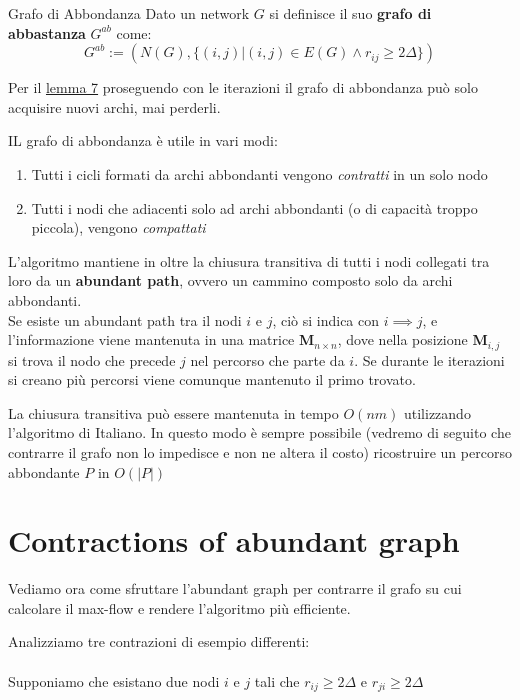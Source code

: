 \documentclass[a4paper, 11pt]{report}
\begin{document}
\begin{definition}{Grafo di Abbondanza}{}
    Dato un network $G$ si definisce il suo \textbf{grafo di abbastanza} $G^{ab}$ come: 
    \[G^{ab} := (N(G), \{(i,j)| (i,j)\in E(G)\land r_{ij}\ge 2\Delta\})\]
\end{definition}
\begin{obs}{}{}
    Per il \hyperref[ab4ever]{lemma 7} proseguendo con le iterazioni il grafo di abbondanza può solo acquisire nuovi archi, mai perderli.
\end{obs}

IL grafo di abbondanza è utile in vari modi: 
\begin{enumerate}
    \item Tutti i cicli formati da archi abbondanti vengono \textit{contratti} in un solo nodo
    \item Tutti i nodi che adiacenti solo ad archi abbondanti (o di capacità troppo piccola), vengono \textit{compattati}
\end{enumerate}
L'algoritmo mantiene in oltre la chiusura transitiva di tutti i nodi collegati tra loro da un \textbf{abundant path}, ovvero un cammino composto solo da archi abbondanti. \\
Se esiste un abundant path tra il nodi $i$ e $j$, ciò si indica con $i\implies j$, e l'informazione viene mantenuta in una matrice \textbf{M}$_{n\times n}$, dove nella posizione 
\textbf{M}$_{i,j}$ si trova il nodo che precede $j$ nel percorso che parte da $i$. Se durante le iterazioni si creano più percorsi viene comunque mantenuto il primo trovato.

La chiusura transitiva può essere mantenuta in tempo $O(nm)$ utilizzando l'algoritmo di Italiano. 
In questo modo è sempre possibile (vedremo di seguito che contrarre il grafo non lo impedisce e non ne altera il costo) ricostruire un percorso abbondante $P$ in $O(|P|)$
\newpage
\section{Contractions of abundant graph}
Vediamo ora come sfruttare l'abundant graph per contrarre il grafo su cui calcolare il max-flow e rendere l'algoritmo più efficiente.

Analizziamo tre contrazioni di esempio differenti:\\
\\
Supponiamo che esistano due nodi $i$ e $j$ tali che $r_{ij} \ge 2\Delta$ e $r_{ji} \ge 2\Delta$
\end{document}
